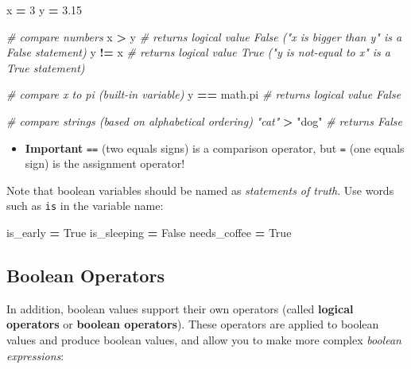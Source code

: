 \documentclass[]{book}
\newenvironment{Shaded}{\begin{snugshade}}{\end{snugshade}}
\newcommand{\DecValTok}[1]{\textcolor[rgb]{0.00,0.00,0.81}{#1}}
\newcommand{\FloatTok}[1]{\textcolor[rgb]{0.00,0.00,0.81}{#1}}
\newcommand{\StringTok}[1]{\textcolor[rgb]{0.31,0.60,0.02}{#1}}
\newcommand{\CommentTok}[1]{\textcolor[rgb]{0.56,0.35,0.01}{\textit{#1}}}
\newcommand{\VariableTok}[1]{\textcolor[rgb]{0.00,0.00,0.00}{#1}}
\newcommand{\OperatorTok}[1]{\textcolor[rgb]{0.81,0.36,0.00}{\textbf{#1}}}
\newcommand{\NormalTok}[1]{#1}
\providecommand{\tightlist}{%
  \setlength{\itemsep}{0pt}\setlength{\parskip}{0pt}}
\begin{document}
\begin{Shaded}
\begin{Highlighting}[]
\NormalTok{x }\OperatorTok{=} \DecValTok{3}
\NormalTok{y }\OperatorTok{=} \FloatTok{3.15}

\CommentTok{# compare numbers}
\NormalTok{x }\OperatorTok{>}\NormalTok{ y  }\CommentTok{# returns logical value False ("x is bigger than y" is a False statement)}
\NormalTok{y }\OperatorTok{!=}\NormalTok{ x  }\CommentTok{# returns logical value True ("y is not-equal to x" is a True statement)}

\CommentTok{# compare x to pi (built-in variable)}
\NormalTok{y }\OperatorTok{==}\NormalTok{ math.pi  }\CommentTok{# returns logical value False}

\CommentTok{# compare strings (based on alphabetical ordering)}
\CommentTok{"cat"} \OperatorTok{>} \StringTok{"dog"}  \CommentTok{# returns False}
\end{Highlighting}
\end{Shaded}

\begin{itemize}
\tightlist
\item
  \textbf{Important} \texttt{==} (two equals signs) is a comparison
  operator, but \texttt{=} (one equals sign) is the assignment operator!
\end{itemize}

Note that boolean variables should be named as \emph{statements of
truth}. Use words such as \texttt{is} in the variable name:

\begin{Shaded}
\begin{Highlighting}[]
\NormalTok{is_early }\OperatorTok{=} \VariableTok{True}
\NormalTok{is_sleeping }\OperatorTok{=} \VariableTok{False}
\NormalTok{needs_coffee }\OperatorTok{=} \VariableTok{True}
\end{Highlighting}
\end{Shaded}

\hypertarget{boolean-operators}{\subsection{Boolean
Operators}\label{boolean-operators}}

In addition, boolean values support their own operators (called
\textbf{logical operators} or \textbf{boolean operators}). These
operators are applied to boolean values and produce boolean values, and
allow you to make more complex \emph{boolean expressions}:
\end{document}
